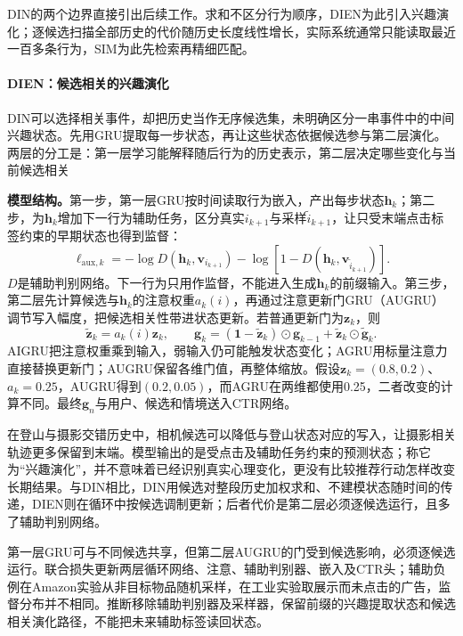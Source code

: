 DIN的两个边界直接引出后续工作。求和不区分行为顺序，DIEN为此引入兴趣演化；逐候选扫描全部历史的代价随历史长度线性增长，实际系统通常只能读取最近一百多条行为，SIM为此先检索再精细匹配。

\paragraph{DIEN：候选相关的兴趣演化}
\label{sec:rs-dien}

DIN可以选择相关事件，却把历史当作无序候选集，未明确区分一串事件中的中间兴趣状态。先用GRU提取每一步状态，再让这些状态依据候选参与第二层演化。两层的分工是：第一层学习能解释随后行为的历史表示，第二层决定哪些变化与当前候选相关

\textbf{模型结构。}第一步，第一层GRU按时间读取行为嵌入，产出每步状态$\bm h_k$；第二步，为$\bm h_k$增加下一行为辅助任务，区分真实$i_{k+1}$与采样$\widetilde i_{k+1}$，让只受末端点击标签约束的早期状态也得到监督：
\begin{equation}
  \ell_{\mathrm{aux},k}
  =-\log D(\bm{h}_k,\bm{v}_{i_{k+1}})
   -\log[1-D(\bm{h}_k,\bm{v}_{\widetilde i_{k+1}})].
  \label{eq:rs-dien-aux}
\end{equation}
$D$是辅助判别网络。下一行为只用作监督，不能进入生成$\bm{h}_k$的前缀输入。第三步，第二层先计算候选与$\bm{h}_k$的注意权重$a_k(i)$，再通过注意更新门GRU（AUGRU）调节写入幅度，把候选相关性带进状态更新。若普通更新门为$\bm{z}_k$，则
\begin{equation}
  \widetilde{\bm{z}}_k=a_k(i)\bm{z}_k,\qquad
  \bm{g}_k=(\bm{1}-\widetilde{\bm{z}}_k)\odot\bm{g}_{k-1}
               +\widetilde{\bm{z}}_k\odot\widetilde{\bm{g}}_k.
  \label{eq:rs-dien-augru}
\end{equation}
AIGRU把注意权重乘到输入，弱输入仍可能触发状态变化；AGRU用标量注意力直接替换更新门；AUGRU保留各维门值，再整体缩放。假设$\bm{z}_k=(0.8,0.2)$、$a_k=0.25$，AUGRU得到$(0.2,0.05)$，而AGRU在两维都使用0.25，二者改变的计算不同。最终$\bm{g}_n$与用户、候选和情境送入CTR网络。

在登山与摄影交错历史中，相机候选可以降低与登山状态对应的写入，让摄影相关轨迹更多保留到末端。模型输出的是受点击及辅助任务约束的预测状态；称它为“兴趣演化”，并不意味着已经识别真实心理变化，更没有比较推荐行动怎样改变长期结果。与DIN相比，DIN用候选对整段历史加权求和、不建模状态随时间的传递，DIEN则在循环中按候选调制更新；后者代价是第二层必须逐候选运行，且多了辅助判别网络。

第一层GRU可与不同候选共享，但第二层AUGRU的门受到候选影响，必须逐候选运行。联合损失更新两层循环网络、注意、辅助判别器、嵌入及CTR头；辅助负例在Amazon实验从非目标物品随机采样，在工业实验取展示而未点击的广告，监督分布并不相同。推断移除辅助判别器及采样器，保留前缀的兴趣提取状态和候选相关演化路径，不能把未来辅助标签读回状态。

